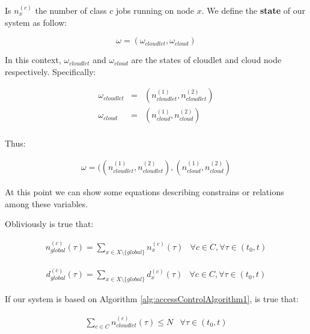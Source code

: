 \documentclass[10pt,a4paper]{article}
\begin{document}
Is $n_x^{(c)}$ the number of class $c$ jobs running on node $x$. We define the \textbf{state} of our system as follow:

\begin{equation}
\omega = (\omega_{cloudlet},\omega_{cloud})
\end{equation}

In this context, $\omega_{cloudlet}$ and $\omega_{cloud}$ are the states of cloudlet and cloud node respectively. Specifically:

\begin{equation}
\begin{array} {rcl} 
\omega_{cloudlet} & = & (n_{cloudlet}^{(1)},n_{cloudlet}^{(2)}) \\
\omega_{cloud} & = & (n_{cloud}^{(1)},n_{cloud}^{(2)}) \\
\end{array}
\end{equation}

Thus:

\begin{equation}
\begin{array} {rcl} 
\omega = ((n_{cloudlet}^{(1)},n_{cloudlet}^{(2)}),(n_{cloud}^{(1)},n_{cloud}^{(2)})
\end{array}
\end{equation}

At this point we can show some equations describing constrains or relations among these variables.

Obliviously is true that:

\begin{equation}
\begin{array} {lr} 
\displaystyle n_{global}^{(c)}(\tau) = \sum_{x \in X \setminus \lbrace global \rbrace } n_x^{(c)}(\tau) & \forall c \in C, \forall \tau \in (t_0, t)
\end{array}
\end{equation}

\begin{equation}
\begin{array} {lr} 
\displaystyle d_{global}^{(c)}(\tau) = \sum_{x \in X \setminus \lbrace global \rbrace } d_x^{(c)}(\tau) & \forall c \in C, \forall \tau \in (t_0, t)
\end{array}
\end{equation}

If our system is based on Algorithm \ref{alg:accessControlAlgorithm1}, is true that:

\begin{equation}
\begin{array} {lr} 
\displaystyle \sum_{c \in C} n_{cloudlet}^{(c)}(\tau) \leq N & \forall \tau \in (t_0, t)
\end{array}
\end{equation}
\end{document}
